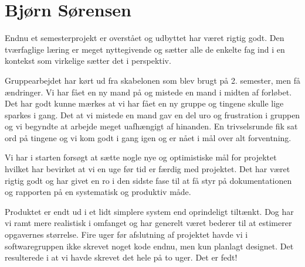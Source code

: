 \section{Bjørn Sørensen}

Endnu et semesterprojekt er overstået og udbyttet har været rigtig godt. Den tværfaglige læring er meget nyttegivende og sætter alle de enkelte fag ind i en kontekst som virkelige sætter det i perspektiv.

Gruppearbejdet har kørt ud fra skabelonen som blev brugt på 2. semester, men få ændringer. Vi har fået en ny mand på og mistede en mand i midten af forløbet. Det har godt kunne mærkes at vi har fået en ny gruppe og tingene skulle lige sparkes i gang. 
Det at vi mistede en mand gav en del uro og frustration i gruppen og vi begyndte at arbejde meget uafhængigt af hinanden. En trivselsrunde fik sat ord på tingene og vi kom godt i gang igen og er nået i mål over alt forventning.

Vi har i starten forsøgt at sætte nogle nye og optimistiske mål for projektet hvilket har bevirket at vi en uge før tid er færdig med projektet. Det har været rigtig godt og har givet en ro i den sidste fase til at få styr på dokumentationen og rapporten på en systematisk og produktiv måde.

Produktet er endt ud i et lidt simplere system end oprindeligt tiltænkt. Dog har vi ramt mere realistisk i omfanget og har generelt været bederer til at estimerer opgavernes størrelse. Fire uger før afslutning af projektet havde vi i softwaregruppen ikke skrevet noget kode endnu, men kun planlagt designet. Det resulterede i at vi havde skrevet det hele på to uger. Det er fedt!